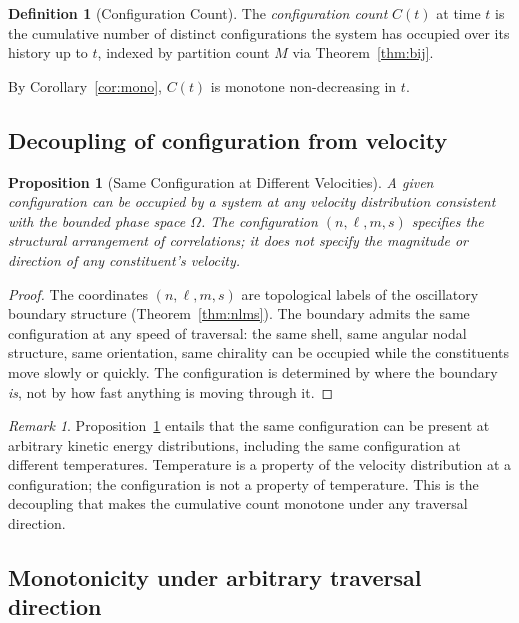 \documentclass[twocolumn,10pt,a4paper]{article}
\theoremstyle{thmstyle}
\newtheorem{proposition}[theorem]{Proposition}
\theoremstyle{definition}
\newtheorem{definition}[theorem]{Definition}
\theoremstyle{remark}
\newtheorem{remark}[theorem]{Remark}
\begin{document}
\begin{definition}[Configuration Count]
\label{def:Cc}
The \emph{configuration count} $C(t)$ at time $t$ is the cumulative
number of distinct configurations the system has occupied over its
history up to $t$, indexed by partition count $M$ via
Theorem~\ref{thm:bij}.
\end{definition}

By Corollary~\ref{cor:mono}, $C(t)$ is monotone non-decreasing in $t$.

\subsection{Decoupling of configuration from velocity}

\begin{proposition}[Same Configuration at Different Velocities]
\label{prop:decouple}
A given configuration can be occupied by a system at any velocity
distribution consistent with the bounded phase space $\Omega$. The
configuration $(n,\ell,m,s)$ specifies the structural arrangement of
correlations; it does not specify the magnitude or direction of any
constituent's velocity.
\end{proposition}

\begin{proof}
The coordinates $(n,\ell,m,s)$ are topological labels of the
oscillatory boundary structure (Theorem~\ref{thm:nlms}). The boundary
admits the same configuration at any speed of traversal: the same
shell, same angular nodal structure, same orientation, same chirality
can be occupied while the constituents move slowly or quickly. The
configuration is determined by where the boundary \emph{is}, not by
how fast anything is moving through it.
\end{proof}

\begin{remark}
\label{rem:tempindep}
Proposition~\ref{prop:decouple} entails that the same configuration
can be present at arbitrary kinetic energy distributions, including
the same configuration at different temperatures. Temperature is a
property of the velocity distribution at a configuration; the
configuration is not a property of temperature. This is the decoupling
that makes the cumulative count monotone under any traversal direction.
\end{remark}

\subsection{Monotonicity under arbitrary traversal direction}
\end{document}
